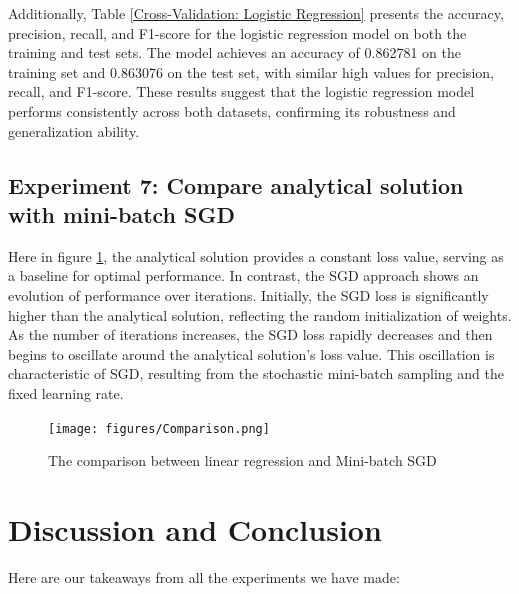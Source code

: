 \documentclass{article}
\begin{document}
Additionally, Table \ref{Cross-Validation: Logistic Regression} presents the accuracy, precision, recall, and F1-score for the logistic regression model on both the training and test sets. The model achieves an accuracy of 0.862781 on the training set and 0.863076 on the test set, with similar high values for precision, recall, and F1-score. These results suggest that the logistic regression model performs consistently across both datasets, confirming its robustness and generalization ability.


\subsection{Experiment 7: Compare analytical solution with mini-batch SGD}
Here in figure \ref{comparison}, the analytical solution provides a constant loss value, serving as a baseline for optimal performance. In contrast, the SGD approach shows an evolution of performance over iterations. Initially, the SGD loss is significantly higher than the analytical solution, reflecting the random initialization of weights. As the number of iterations increases, the SGD loss rapidly decreases and then begins to oscillate around the analytical solution's loss value. This oscillation is characteristic of SGD, resulting from the stochastic mini-batch sampling and the fixed learning rate.

\begin{figure}[H]
        \centering
        \texttt{[image: figures/Comparison.png]}

    \caption{The comparison between linear regression and Mini-batch SGD}
    \label{comparison}
\end{figure}




\section{Discussion and Conclusion}

Here are our takeaways from all the experiments we have made:
\end{document}
